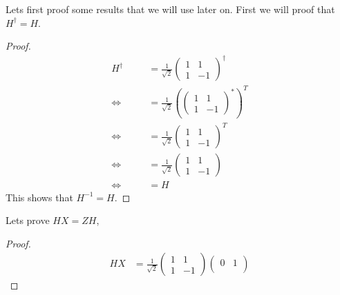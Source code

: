 \documentclass[addpoints]{exam}
\begin{document}
\begin{questions}
	\begin{solution}
		Lets first proof some results that we will use later on. First we will proof that \(H^\dagger = H\).
		\begin{proof}
			\label{HinveqH}
			\begin{align*}
				H^\dagger   & = \frac{1}{\sqrt{2}} \begin{pmatrix}
					                                   1 & 1  \\
					                                   1 & -1
				                                   \end{pmatrix}^\dagger          \\
				\iff \qquad & = \frac{1}{\sqrt{2}} \left(\begin{pmatrix}
						                                         1 & 1  \\
						                                         1 & -1
					                                         \end{pmatrix}^*\right)^T \\
				\iff \qquad & = \frac{1}{\sqrt{2}} \begin{pmatrix}
					                                   1 & 1  \\
					                                   1 & -1
				                                   \end{pmatrix}^T                \\
				\iff \qquad & = \frac{1}{\sqrt{2}} \begin{pmatrix}
					                                   1 & 1  \\
					                                   1 & -1
				                                   \end{pmatrix}                 \\
				\iff \qquad & = H
			\end{align*}
			This shows that \(H^{-1}=H\).
		\end{proof}
		Lets prove \(HX=ZH\),
		\begin{proof}
			\begin{align*}
				HX          & = \frac{1}{\sqrt{2}} \begin{pmatrix}
					                                   1 & 1  \\
					                                   1 & -1
				                                   \end{pmatrix} \begin{pmatrix}
					                                                 0 & 1 \\

\end{pmatrix}
\end{align*}
\end{proof}
\end{solution}
\end{questions}
\end{document}
